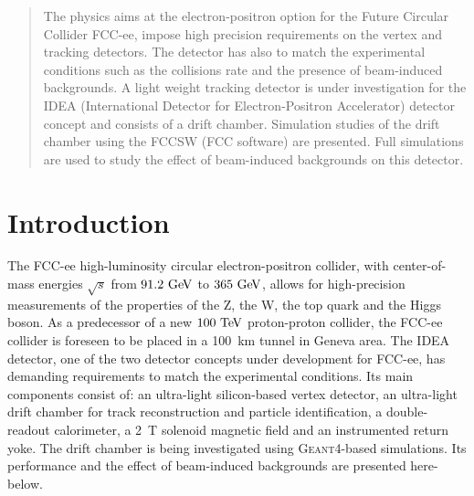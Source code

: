 \documentclass[conference]{IEEEtran}
\begin{document}




\maketitle
\thispagestyle{plain}
\pagestyle{plain}

\begin{abstract}
The physics aims at the electron-positron option for  the Future Circular Collider FCC-ee, impose high precision requirements on the vertex and tracking detectors.  The detector has also to match the experimental conditions such as the collisions rate and the presence of beam-induced backgrounds.
A light weight tracking detector is under investigation for the IDEA (International Detector for Electron-Positron Accelerator) detector concept and consists of a drift chamber. Simulation studies of the drift chamber using the FCCSW (FCC software) are presented. Full simulations are used to study the effect of beam-induced backgrounds on this detector.

\end{abstract}

\IEEEpeerreviewmaketitle


\section{Introduction}
The FCC-ee high-luminosity circular electron-positron collider, with center-of-mass energies $\sqrt{s}$ from $91.2\,\mathrm{\,Ge\kern -0.1em V}$ to
$365\,\mathrm{\,Ge\kern -0.1em V}$, allows for high-precision measurements of the properties of the Z, the W, the top quark and the Higgs boson. As a predecessor of a new $100\,\mathrm{\,Te\kern -0.1em V}$ proton-proton collider, the FCC-ee collider is foreseen to be placed in a 100~km tunnel in Geneva area. The IDEA detector, one of the two detector concepts under development for FCC-ee, has demanding requirements to match the experimental conditions. Its main components consist of: an ultra-light silicon-based vertex detector, an ultra-light drift chamber for track reconstruction and particle identification, a double-readout calorimeter, a 2~T solenoid magnetic field and an instrumented return yoke. The drift chamber is being investigated using \textsc{Geant4}-based simulations. Its performance and the effect of beam-induced backgrounds are presented here-below.
\end{document}
